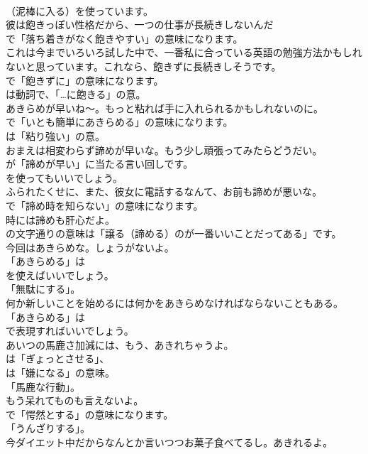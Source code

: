 \documentclass[8pt]{extreport}
\begin{document}
\begin{CJK}{UTF8}{min}
\\	（泥棒に入る）を使っています。	
\\	彼は飽きっぽい性格だから、一つの仕事が長続きしないんだ 
\\	で「落ち着きがなく飽きやすい」の意味になります。	
\\	これは今までいろいろ試した中で、一番私に合っている英語の勉強方法かもしれないと思っています。これなら、飽きずに長続きしそうです。 
\\	で「飽きずに」の意味になります。
\\	は動詞で、「…に飽きる」の意。	
\\	あきらめが早いね～。もっと粘れば手に入れられるかもしれないのに。 
\\	で「いとも簡単にあきらめる」の意味になります。
\\	は「粘り強い」の意。	
\\	おまえは相変わらず諦めが早いな。もう少し頑張ってみたらどうだい。 
\\	が「諦めが早い」に当たる言い回しです。
\\	を使ってもいいでしょう。	
\\	ふられたくせに、また、彼女に電話するなんて、お前も諦めが悪いな。 
\\	で「諦め時を知らない」の意味になります。	
\\	時には諦めも肝心だよ。 
\\	の文字通りの意味は「譲る（諦める）のが一番いいことだってある」です。	
\\	今回はあきらめな。しょうがないよ。 
\\	「あきらめる」は
\\	を使えばいいでしょう。
\\	「無駄にする」。	
\\	何か新しいことを始めるには何かをあきらめなければならないこともある。 
\\	「あきらめる」は 
\\	で表現すればいいでしょう。	
\\	あいつの馬鹿さ加減には、もう、あきれちゃうよ。 
\\	は「ぎょっとさせる」、
\\	は「嫌になる」の意味。
\\	「馬鹿な行動」。	
\\	もう呆れてものも言えないよ。 
\\	で「愕然とする」の意味になります。
\\	「うんざりする」。	
\\	今ダイエット中だからなんとか言いつつお菓子食べてるし。あきれるよ。 

\end{CJK}
\end{document}
